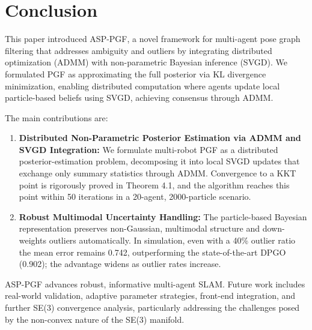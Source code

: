 \section{Conclusion}
\label{sec:conclusion}

This paper introduced ASP-PGF, a novel framework for multi-agent pose graph filtering that addresses ambiguity and outliers by integrating distributed optimization (ADMM) with non-parametric Bayesian inference (SVGD). We formulated PGF as approximating the full posterior via KL divergence minimization, enabling distributed computation where agents update local particle-based beliefs using SVGD, achieving consensus through ADMM.

The main contributions are:
\begin{enumerate}
    \item \textbf{Distributed Non-Parametric Posterior Estimation via ADMM and SVGD Integration:} We formulate multi-robot PGF as a distributed posterior-estimation problem, decomposing it into local SVGD updates that exchange only summary statistics through ADMM.
    Convergence to a KKT point is rigorously proved in Theorem 4.1, and the algorithm reaches this point within 50 iterations in a 20-agent, 2000-particle scenario.
    \item \textbf{Robust Multimodal Uncertainty Handling:} The particle-based Bayesian representation preserves non-Gaussian, multimodal structure and down-weights outliers automatically.
    In simulation, even with a 40\% outlier ratio the mean error remains 0.742, outperforming the state-of-the-art DPGO (0.902); the advantage widens as outlier rates increase.
\end{enumerate}
ASP-PGF advances robust, informative multi-agent SLAM. Future work includes real-world validation, adaptive parameter strategies, front-end integration, and further SE(3) convergence analysis, particularly addressing the challenges posed by the non-convex nature of the SE(3) manifold.
